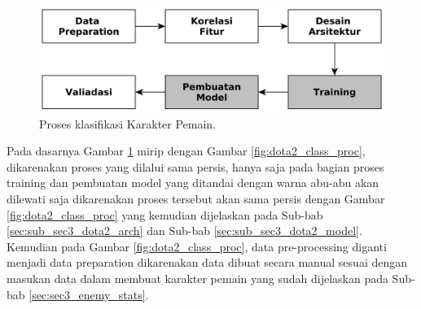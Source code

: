 \begin{figure} [!h] \centering
	\includegraphics[scale=0.032]{img/player_char_nn_classification.png}
	\caption{Proses klasifikasi Karakter Pemain.}
	\label{fig:enemy_class_proc}
\end{figure}

Pada dasarnya Gambar \ref{fig:enemy_class_proc} mirip dengan Gambar \ref{fig:dota2_class_proc}, dikarenakan proses yang dilalui sama persis, hanya saja pada bagian proses training dan pembuatan model yang ditandai dengan warna abu-abu akan dilewati saja dikarenakan proses tersebut akan sama persis dengan Gambar \ref{fig:dota2_class_proc} yang kemudian dijelaskan pada Sub-bab \ref{sec:sub_sec3_dota2_arch} dan Sub-bab \ref{sec:sub_sec3_dota2_model}. Kemudian pada Gambar \ref{fig:dota2_class_proc}, data pre-processing diganti menjadi data preparation dikarenakan data dibuat secara manual sesuai dengan masukan data dalam membuat karakter pemain yang sudah dijelaskan pada Sub-bab \ref{sec:sec3_enemy_stats}.
\vspace{1ex}